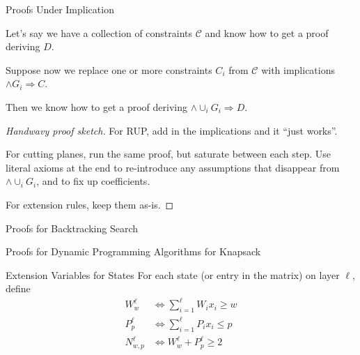 \documentclass[aspectratio=169,compress,10pt]{beamer}
\begin{document}
\begin{frame}{Proofs Under Implication}
    \begin{theorem}
    Let's say we have a collection of constraints $\mathcal{C}$ and know how to get a proof deriving
        $D$. \\\medskip

    Suppose now we replace one or more constraints $C_i$ from $\mathcal{C}$ with implications $\land
        G_i \Rightarrow C$. \\\medskip

    Then we know how to get a proof deriving $\land \cup_i G_i \Rightarrow D$.
    \end{theorem}
    \begin{proof}[Handwavy proof sketch]
        For RUP, add in the implications and it ``just works''. \\\medskip

        For cutting planes, run the same proof, but saturate between each step. Use literal
        axioms at the end to re-introduce any assumptions that disappear from $\land \cup_i G_i$,
        and to fix up coefficients. \\\medskip

        For extension rules, keep them as-is.
    \end{proof}
\end{frame}

\begin{frame}{Proofs for Backtracking Search}
\end{frame}

\begin{frame}{Proofs for Dynamic Programming Algorithms for Knapsack}
\end{frame}

\begin{frame}{Extension Variables for States}
    For each state (or entry in the matrix) on layer $\ell$, define
    \begin{align*}
        W^{\ell}_{w} &\Leftrightarrow \sum_{i=1}^{\ell} W_i x_i \ge w \\[0.3cm]
        P^{\ell}_{p} &\Leftrightarrow \sum_{i=1}^{\ell} P_i x_i \le p \\[0.3cm]
        N^{\ell}_{w,p} & \Leftrightarrow W^{\ell}_{w} + P^{\ell}_{p} \ge 2
    \end{align*}
\end{frame}
\end{document}
